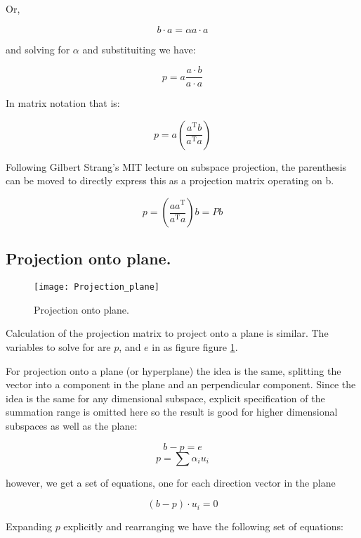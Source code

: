 \documentclass{article}      %
\DeclareMathOperator{\TextTranspose}{T}
\newcommand{\transpose}[1]{{{#1}^{\TextTranspose}}}
\begin{document}
Or, 

\[
b \cdot a = \alpha a \cdot a
\]

and solving for $\alpha$ and substituiting we have:

\begin{equation}
p = a \frac{a \cdot b}{a \cdot a}
\end{equation}

In matrix notation that is:

\begin{equation}
p = a \left(\frac{\transpose{a} b}{\transpose{a} a} \right)
\end{equation}

Following Gilbert Strang's MIT lecture on subspace projection, the parenthesis can be moved to directly express this as a projection matrix operating on b.

\begin{equation}\label{eqn:projectmatrixline}
p = \left(\frac{a \transpose{a}}{\transpose{a} a}\right) b = P b
\end{equation}

\subsection{ Projection onto plane. }

\begin{figure}[htp]
\centering
\texttt{[image: Projection\_plane]}
\caption{Projection onto plane.}\label{fig:Projection_plane}
\end{figure}

Calculation of the projection matrix to project onto a plane is similar.  The variables to solve for are $p$, and $e$ in as figure
figure \ref{fig:Projection_plane}.

For projection onto a plane (or hyperplane) the idea is the same, splitting the vector into a component in the plane and an perpendicular component.
Since the
idea is the same for any dimensional subspace, explicit specification of the summation range is omitted here so the result is good for higher dimensional
subspaces as well as the plane:

\[
b - p = e
\]
\[
p = \sum \alpha_i u_i
\]

however, we get a set of equations, one for each direction vector in the plane

\[
(b - p) \cdot u_i = 0
\]

Expanding $p$ explicitly and rearranging we have the following set of equations:
\end{document}
